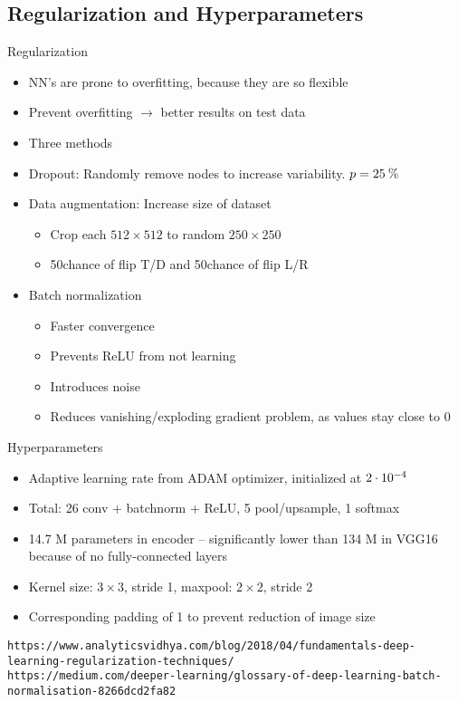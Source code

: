 \documentclass[12pt,fleqn]{article}
\begin{document}
\subsection{Regularization and Hyperparameters}
Regularization
\begin{itemize}
	\item NN's are prone to overfitting, because they are so flexible
	\item Prevent overfitting $ \to $ better results on test data
	\item Three methods
	\item Dropout: Randomly remove nodes to increase variability. $ p=25\:\text{\%{}} $
	\item Data augmentation: Increase size of dataset
	\begin{itemize}
		\item Crop each $ 512\times 512 $ to random $ 250\times 250 $
		\item 50\pro chance of flip T/D and 50\pro chance of flip L/R
	\end{itemize}
	\item Batch normalization
	\begin{itemize}
		\item Faster convergence
		\item Prevents ReLU from not learning
		\item Introduces noise
		\item Reduces vanishing/exploding gradient problem, as values stay close to 0
	\end{itemize}
\end{itemize}
Hyperparameters
\begin{itemize}
	\item Adaptive learning rate from ADAM optimizer, initialized at $ 2\cdot10^{-4} $
	\item Total: 26 conv + batchnorm + ReLU, 5 pool/upsample, 1 softmax
	\item 14.7 M parameters in encoder -- significantly lower than 134 M in VGG16 because of no fully-connected layers
	\item Kernel size: $ 3\times 3 $, stride 1, maxpool: $ 2\times 2 $, stride 2
	\item Corresponding padding of 1 to prevent reduction of image size
\end{itemize}
\texttt{https://www.analyticsvidhya.com/blog/2018/04/fundamentals-deep-learning-regularization-techniques/}\\
\texttt{https://medium.com/deeper-learning/glossary-of-deep-learning-batch-normalisation-8266dcd2fa82}
\end{document}
